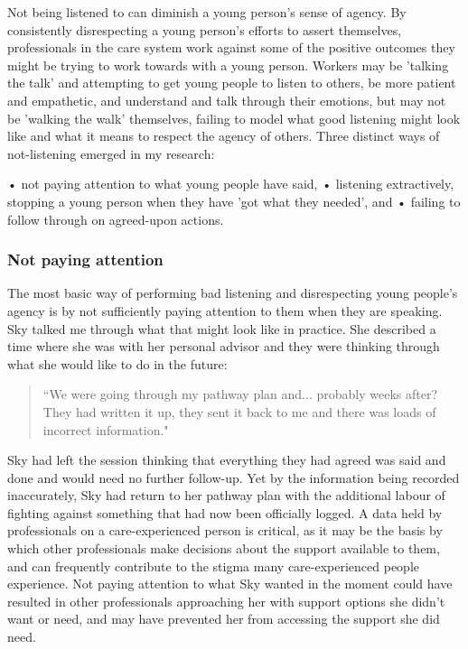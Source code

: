 Not being listened to can diminish a young person's sense of agency. By consistently disrespecting a young person's efforts to assert themselves, professionals in the care system work against some of the positive outcomes they might be trying to work towards with a young person. Workers may be 'talking the talk' and attempting to get young people to listen to others, be more patient and empathetic, and understand and talk through their emotions, but may not be 'walking the walk' themselves, failing to model what good listening might look like and what it means to respect the agency of others. Three distinct ways of not-listening emerged in my research:

•	not paying attention to what young people have said,
•	listening extractively, stopping a young person when they have 'got what they needed', and
•	failing to follow through on agreed-upon actions.

\subsubsection{Not paying attention}
The most basic way of performing bad listening and disrespecting young people's agency is by not sufficiently paying attention to them when they are speaking. Sky talked me through what that might look like in practice. She described a time where she was with her personal advisor and they were thinking through what she would like to do in the future:

\begin{quote}
“We were going through my pathway plan and... probably weeks after? They had written it up, they sent it back to me and there was loads of incorrect information."
\end{quote}

Sky had left the session thinking that everything they had agreed was said and done and would need no further follow-up. Yet by the information being recorded inaccurately, Sky had return to her pathway plan with the additional labour of fighting against something that had now been officially logged. A data held by professionals on a care-experienced person is critical, as it may be the basis by which other professionals make decisions about the support available to them, and can frequently contribute to the stigma many care-experienced people experience. Not paying attention to what Sky wanted in the moment could have resulted in other professionals approaching her with support options she didn't want or need, and may have prevented her from accessing the support she did need.


